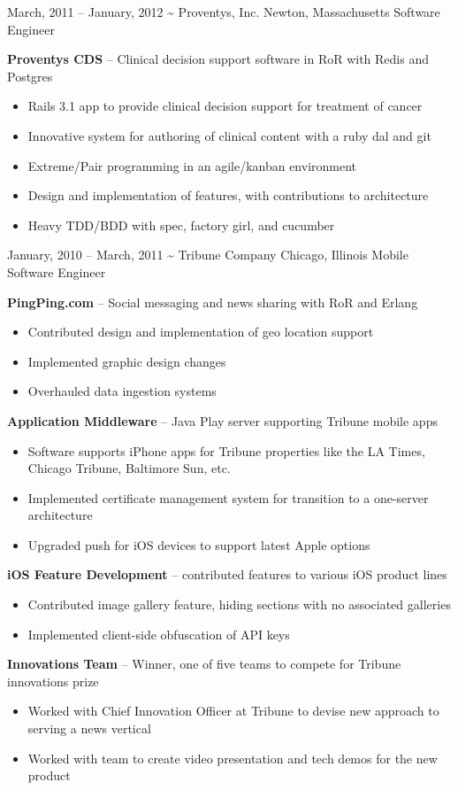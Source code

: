 \documentclass[]{friggeri-cv}
\begin{document}
\begin{entrylist}
    \entryalt
    {March, 2011 -- January, 2012}
    {\textbf{\textasciitilde} Proventys, Inc.}
    {Newton, Massachusetts}
    {Software Engineer}
    {\textbf{Proventys CDS} -- Clinical decision support software in RoR with Redis and Postgres
    \begin{itemize}
      \item Rails 3.1 app to provide clinical decision support for treatment of cancer
      \item Innovative system for authoring of clinical content with a ruby dal and git
      \item Extreme/Pair programming in an agile/kanban environment
      \item Design and implementation of features, with contributions to architecture
      \item Heavy TDD/BDD with spec, factory girl, and cucumber     
    \end{itemize}}
    
    \entryalt
    {January, 2010 -- March, 2011}
    {\textbf{\textasciitilde} Tribune Company}
    {Chicago, Illinois}
    {Mobile Software Engineer}
    {\textbf{PingPing.com} -- Social messaging and news sharing with RoR and Erlang
    \begin{itemize}
      \item Contributed design and implementation of geo location support
      \item Implemented graphic design changes
      \item Overhauled data ingestion systems
    \end{itemize}
    \textbf{Application Middleware} -- Java Play server supporting Tribune mobile apps
    \begin{itemize}
      \item Software supports iPhone apps for Tribune properties like the LA Times, Chicago Tribune, Baltimore Sun, etc.
      \item Implemented certificate management system for transition to a one-server architecture
      \item Upgraded push for iOS devices to support latest Apple options
    \end{itemize}
    \textbf{iOS Feature Development} -- contributed features to various iOS product lines
    \begin{itemize}
      \item Contributed image gallery feature, hiding sections with no associated galleries
      \item Implemented client-side obfuscation of API keys
    \end{itemize}
    \textbf{Innovations Team} -- Winner, one of five teams to compete for Tribune innovations prize
    \begin{itemize}
      \item Worked with Chief Innovation Officer at Tribune to devise new approach to serving a news vertical
      \item Worked with team to create video presentation and tech demos for the new product
    \end{itemize}}


\end{entrylist}
\end{document}
